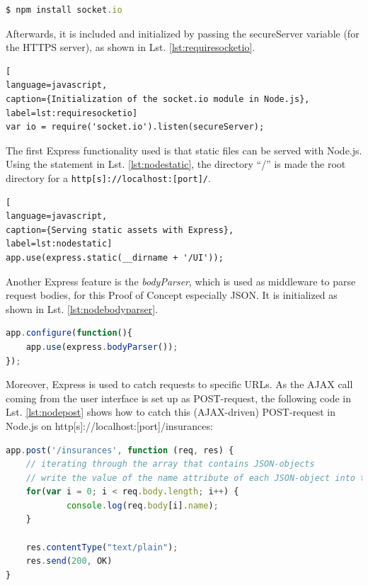 \begin{lstlisting}[language=javascript,
caption={Command to install socket.io via Node.js' package manager},
label=lst:installsocketio,
morekeywords={npm}]
$ npm install socket.io
\end{lstlisting}%

Afterwards, it is included and initialized by passing the secureServer variable
(for the HTTPS server), as shown in Lst. \ref{lst:requiresocketio}.

\begin{lstlisting}[
language=javascript,
caption={Initialization of the socket.io module in Node.js},
label=lst:requiresocketio]
var io = require('socket.io').listen(secureServer);
\end{lstlisting}

The first Express functionality used is that static files can be served with
Node.js. Using the statement in Lst. \ref{lst:nodestatic}, the directory “/” is made the root
directory for a \texttt{http[s]://localhost:[port]/}.

\begin{lstlisting}[
language=javascript,
caption={Serving static assets with Express},
label=lst:nodestatic]
app.use(express.static(__dirname + '/UI'));
\end{lstlisting}

Another Express feature is the \textit{bodyParser}, which is used as middleware to
parse request bodies, for this Proof of Concept especially JSON. It is initialized as shown in Lst. \ref{lst:nodebodyparser}.

\begin{lstlisting}[language=javascript,caption={Using the bodyParser},label=lst:nodebodyparser]
app.configure(function(){
    app.use(express.bodyParser());
});
\end{lstlisting}

Moreover, Express is used to catch requests to specific URLs. As the AJAX call coming from the user interface is set up as POST-request, the following code in Lst. \ref{lst:nodepost} shows how to catch this (AJAX-driven) POST-request in Node.js on http[s]://localhost:[port]/insurances:

\begin{lstlisting}[language=javascript,caption={Iteration through an array consisting of JSON data},label=lst:nodepost]
app.post('/insurances', function (req, res) {
	// iterating through the array that contains JSON-objects
	// write the value of the name attribute of each JSON-object into the console
	for(var i = 0; i < req.body.length; i++) {
        	console.log(req.body[i].name);
	}

	res.contentType("text/plain");
	res.send(200, OK)
}
\end{lstlisting}

